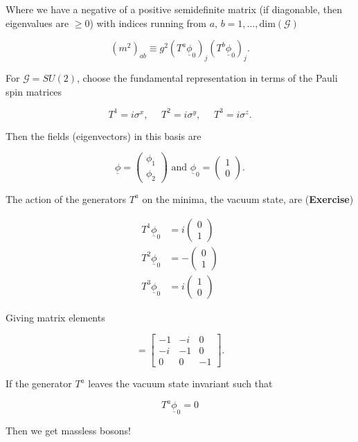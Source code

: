 \noindent Where we have a negative of a positive semidefinite matrix (if diagonable, then eigenvalues are $\ge 0$) with indices running from $a, \, b = 1, \dots, \text{dim}(\mathcal{G})$

\begin{equation}
(m^2)_{ab} \equiv g^2 (T^a \underline{\phi}_0 )_j (T^b \underline{\phi}_0)_j.
\end{equation}

\noindent For $\mathcal{G} = SU(2)$, choose the fundamental representation in terms of the Pauli spin matrices

\begin{equation}
T^1 = i \sigma^x, \,\,\,\,\,\,\,\, T^2 = i \sigma^y , \,\,\,\,\,\,\,\, T^3 = i \sigma^z.
\end{equation}

\noindent Then the fields (eigenvectors) in this basis are

\begin{equation}
\underline{\phi} = \begin{pmatrix} \phi_1 \\ \phi_2 \end{pmatrix} \text{ and } \underline{\phi}_0 = \begin{pmatrix} 1 \\ 0 \end{pmatrix}.
\end{equation}

\noindent The action of the generators $T^a$ on the minima, the vacuum state, are (\textbf{Exercise})

\begin{align}
T^1 \underline{\phi}_0 &= i \begin{pmatrix} 0 \\ 1 \end{pmatrix} \\
T^2 \underline{\phi}_0 &= - \begin{pmatrix} 0 \\ 1 \end{pmatrix} \\
T^3 \underline{\phi}_0 &= i \begin{pmatrix} 1 \\ 0 \end{pmatrix} 
\end{align}

\noindent Giving matrix elements

\begin{equation}
[m^2] = 
\begin{bmatrix}
 -1 & -i & 0 \\
 -i & -1 & 0 \\
  0 & 0 & -1
\end{bmatrix}.
\end{equation}

\noindent If the generator $T^a$ leaves the vacuum state invariant such that

\begin{equation}
T^a \underline{\phi}_0 = 0
\end{equation}

\noindent Then we get massless bosons!